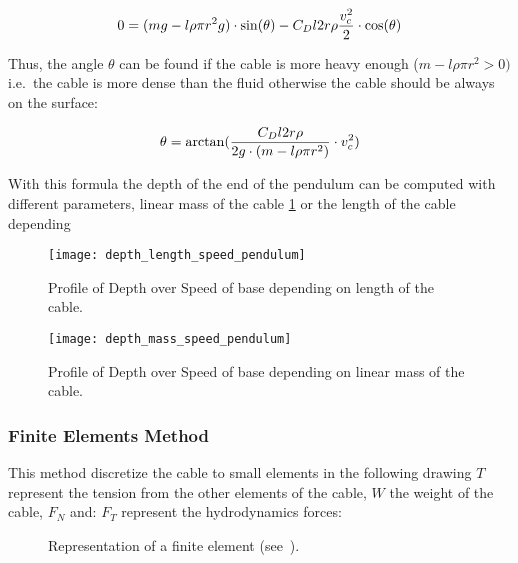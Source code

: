 \begin{equation}
 0 = (m g - l \rho \pi r^2 g) \cdot \sin(\theta)-C_D l 2 r \rho \frac{v_c^2}{2} \cdot \cos(\theta)\\
 \label{equ_Stab_2}
\end{equation}

Thus, the angle $\theta$ can be found if the cable is more heavy enough ($m -l \rho \pi r^2 > 0)$ i.e.\ the cable is more dense than the fluid otherwise the cable should be always on the surface:

\begin{equation}
 \theta = \arctan(\frac{C_D l 2 r \rho}{2 g \cdot (m - l \rho \pi r^2)} \cdot v_c^2)\\
 \label{equ_theta_1}
 \end{equation}
 
With this formula the depth of the end of the pendulum can be computed with different parameters, linear mass of the cable \ref{fig:depth_mass_speed_pendulum} or the length of the cable depending 
 
 \begin{figure}[H]
\centering
    \begin{minipage}[b]{0.4\textwidth}
    \centering
    \texttt{[image: depth\_length\_speed\_pendulum]}
    \caption{Profile of Depth over Speed of base depending on length of the cable.}
    \label{fig:depth_length_speed_pendulum}
    \end{minipage}
    \hfill
    \begin{minipage}[b]{0.4\textwidth}
    \centering
    \texttt{[image: depth\_mass\_speed\_pendulum]}
    \caption{Profile of Depth over Speed of base depending on linear mass of the cable.}
    \label{fig:depth_mass_speed_pendulum}
    \end{minipage}
\end{figure}

\subsubsection*{Finite Elements Method}
 
 
 This method discretize the cable to small elements in the following drawing $T$ represent the tension from the other elements of the cable, $W$ the weight of the cable, $F_N$ and: $F_T$ represent the hydrodynamics forces:
 
\begin{figure}[H]
\centering
{} %
{

}
    \caption{Representation of a finite element (see~\cite{obligado2013experimental}).}
    \label{fig:finite_elem}
\end{figure}

